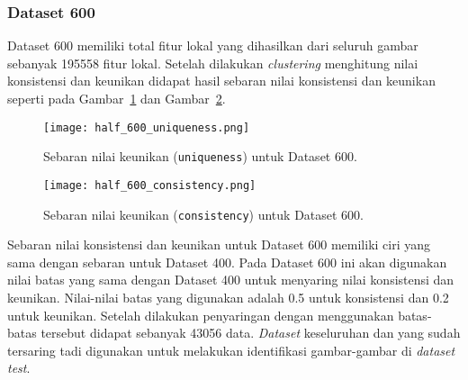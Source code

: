 \subsubsection{Dataset 600}
Dataset 600 memiliki total fitur lokal yang dihasilkan dari seluruh gambar sebanyak 195558 fitur lokal. Setelah dilakukan \textit{clustering} menghitung nilai konsistensi dan keunikan didapat hasil sebaran nilai konsistensi dan keunikan seperti pada Gambar~\ref{fig:half_600_uniqueness} dan Gambar~\ref{fig:half_600_consistency}.
\begin{figure}[H]
	\centering
	\texttt{[image: half\_600\_uniqueness.png]}
	\caption{Sebaran nilai keunikan (\texttt{uniqueness}) untuk Dataset 600.}
	\label{fig:half_600_uniqueness}
\end{figure}
\begin{figure}[H]
	\centering
	\texttt{[image: half\_600\_consistency.png]}
	\caption{Sebaran nilai keunikan (\texttt{consistency}) untuk Dataset 600.}
	\label{fig:half_600_consistency}
\end{figure}
Sebaran nilai konsistensi dan keunikan untuk Dataset 600 memiliki ciri yang sama dengan sebaran untuk Dataset 400. Pada Dataset 600 ini akan digunakan nilai batas yang sama dengan Dataset 400 untuk menyaring nilai konsistensi dan keunikan. Nilai-nilai batas yang digunakan adalah 0.5 untuk konsistensi dan 0.2 untuk keunikan. Setelah dilakukan penyaringan dengan menggunakan batas-batas tersebut didapat sebanyak 43056 data. \textit{Dataset} keseluruhan dan yang sudah tersaring tadi digunakan untuk melakukan identifikasi gambar-gambar di \textit{dataset} \textit{test}.
